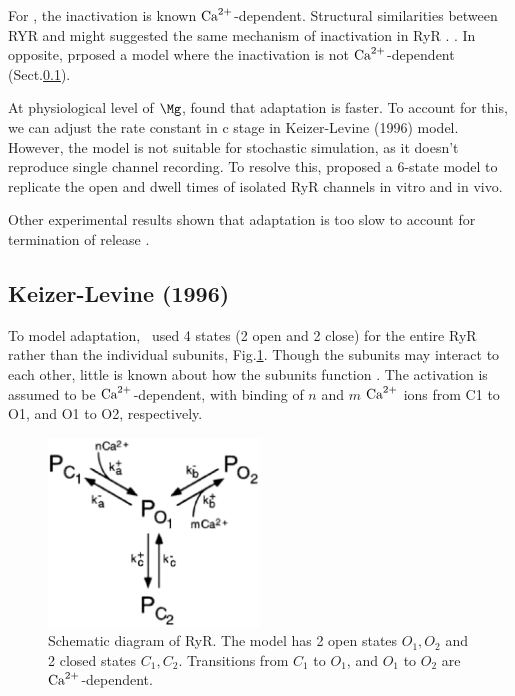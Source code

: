 For \tIPthreeR, the inactivation is known ${\text{Ca}^{2+}}$-dependent. Structural
similarities between RYR and \tIPthreeR might suggested the same mechanism of
inactivation in RyR \citep{berridge1993}. \citep{tang1994, cheng1995}. In
opposite, \cite{keizer1996rra} prposed a model where the inactivation is not
${\text{Ca}^{2+}}$-dependent (Sect.\ref{sec:keizer-levine-1996}).

At physiological level of $\Mg$, \citep{valdivia1995} found that adaptation is
faster. To account for this, we can adjust the rate constant in c stage in
Keizer-Levine (1996) model. However, the model is not suitable for stochastic
simulation, as it doesn't reproduce single channel recording. To resolve this,
\citep{keizer1998} proposed a 6-state model to replicate the open and dwell
times of isolated RyR channels in vitro and in vivo.

Other experimental results shown that adaptation is too slow to account for
termination of release \citep{valdivia1995}.

\subsection{Keizer-Levine (1996)}
\label{sec:keizer-levine-1996}

To model adaptation,~\citep{keizer1996rra} used 4 states (2 open and 2 close)
for the entire RyR rather than the individual subunits,
Fig.\ref{fig:Keizer_Levine_RyR}. Though the subunits may interact to each other,
little is known about how the subunits function \citep{ogawa1994}. The
activation is assumed to be ${\text{Ca}^{2+}}$-dependent, with binding of $n$ and $m$ ${\text{Ca}^{2+}}$
ions from C1 to O1, and O1 to O2, respectively.

\begin{figure}[hbt]
  \centerline{\includegraphics[height=5cm,
    angle=0]{./images/KeizerLevine_model.eps}}
  \caption{Schematic diagram of RyR. The model has 2 open states $O_1,
    O_2$ and 2 closed states $C_1, C_2$. Transitions from $C_1$ to
    $O_1$, and $O_1$ to $O_2$ are ${\text{Ca}^{2+}}$-dependent.}
\label{fig:Keizer_Levine_RyR}
\end{figure}

